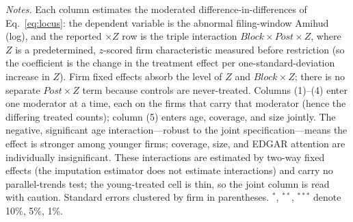 \begin{table}[t]
\begin{threeparttable}
\begin{tablenotes}
\item \textit{Notes.} Each column estimates the moderated difference-in-differences of Eq.~\eqref{eq:locus}: the dependent variable is the abnormal filing-window Amihud (log), and the reported $\times Z$ row is the triple interaction $\mathit{Block}\times\mathit{Post}\times Z$, where $Z$ is a predetermined, $z$-scored firm characteristic measured before restriction (so the coefficient is the change in the treatment effect per one-standard-deviation increase in $Z$). Firm fixed effects absorb the level of $Z$ and $\mathit{Block}\times Z$; there is no separate $\mathit{Post}\times Z$ term because controls are never-treated. Columns (1)--(4) enter one moderator at a time, each on the firms that carry that moderator (hence the differing treated counts); column (5) enters age, coverage, and size jointly. The negative, significant age interaction---robust to the joint specification---means the effect is stronger among younger firms; coverage, size, and EDGAR attention are individually insignificant. These interactions are estimated by two-way fixed effects (the imputation estimator does not estimate interactions) and carry no parallel-trends test; the young-treated cell is thin, so the joint column is read with caution. Standard errors clustered by firm in parentheses. $^{*}$, $^{**}$, $^{***}$ denote 10\%, 5\%, 1\%.
\end{tablenotes}
\end{threeparttable}
\end{table}
